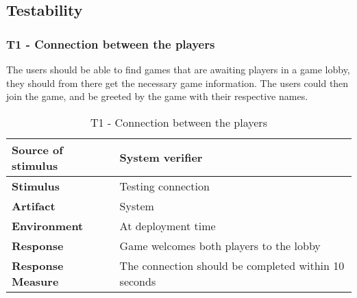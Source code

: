 \subsection{Testability}

\subsubsection{T1 - Connection between the players}
The users should be able to find games that are awaiting players in a game lobby, they should from there get the necessary game information. The users could then join the game, and be greeted by the game with their respective names. 

\begin{table}[h!]
\begin{tabular}{ | p{110pt} | p{250pt}  |}
\hline
\bf Source of stimulus & System verifier  \\ \hline
\bf Stimulus & Testing connection \\ \hline 
\bf Artifact & System  \\  \hline
\bf Environment & At deployment time \\ \hline
\bf Response & Game welcomes both players to the lobby \\ \hline
\bf Response Measure & The connection should be completed within 10 seconds \\ \hline

\end{tabular}
\caption{T1 - Connection between the players}
\end{table}

\pagebreak



